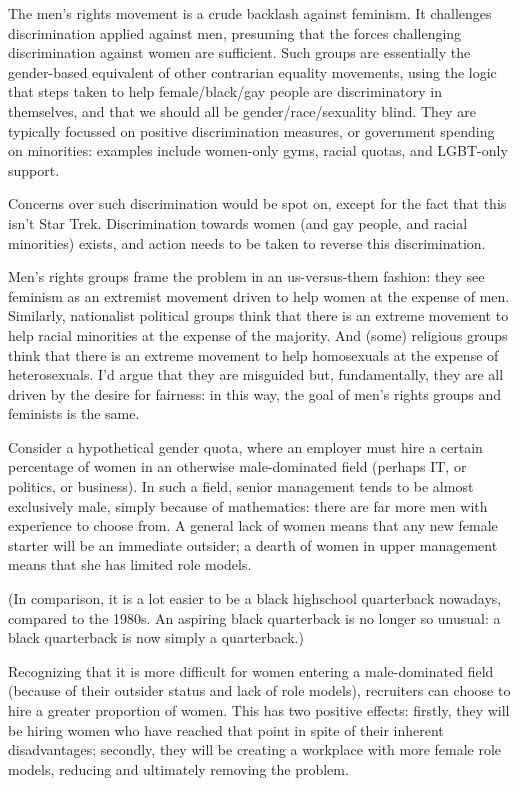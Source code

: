 The men's rights movement is a crude backlash against feminism. It challenges discrimination applied against men, presuming that the forces challenging discrimination against women are sufficient. Such groups are essentially the gender-based equivalent of other contrarian equality movements, using the logic that steps taken to help female/black/gay people are discriminatory in themselves, and that we should all be gender/race/sexuality blind. They are typically focussed on positive discrimination measures, or government spending on minorities: examples include women-only gyms, racial quotas, and LGBT-only support.

Concerns over such discrimination would be spot on, except for the fact that this isn't Star Trek. Discrimination towards women (and gay people, and racial minorities) exists, and action needs to be taken to reverse this discrimination.

Men's rights groups frame the problem in an us-versus-them fashion: they see feminism as an extremist movement driven to help women at the expense of men. Similarly, nationalist political groups think that there is an extreme movement to help racial minorities at the expense of the majority. And (some) religious groups think that there is an extreme movement to help homosexuals at the expense of heterosexuals. I'd argue that they are misguided but, fundamentally, they are all driven by the desire for fairness: in this way, the goal of men's rights groups and feminists is the same.

Consider a hypothetical gender quota, where an employer must hire a certain percentage of women in an otherwise male-dominated field (perhaps IT, or politics, or business). In such a field, senior management tends to be almost exclusively male, simply because of mathematics: there are far more men with experience to choose from. A general lack of women means that any new female starter will be an immediate outsider; a dearth of women in upper management means that she has limited role models.

(In comparison, it is a lot easier to be a black highschool quarterback nowadays, compared to the 1980s. An aspiring black quarterback is no longer so unusual: a black quarterback is now simply a quarterback.)

Recognizing that it is more difficult for women entering a male-dominated field (because of their outsider status and lack of role models), recruiters can choose to hire a greater proportion of women. This has two positive effects: firstly, they will be hiring women who have reached that point in spite of their inherent disadvantages; secondly, they will be creating a workplace with more female role models, reducing and ultimately removing the problem.

